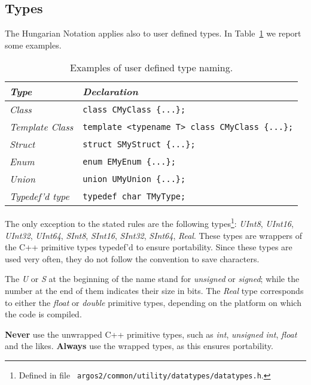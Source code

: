 \documentclass[a4paper]{article}
\begin{document}
\subsection{Types}
\label{subsec:types}
The Hungarian Notation applies also to user defined types. In Table~\ref{table:type_naming}
we report some examples.
\begin{table}[t]
  \caption{Examples of user defined type naming.}
  \label{table:type_naming}
  \centering
  \begin{footnotesize}
    \begin{tabular}{l l}
      \toprule
      {\it Type} & {\it Declaration}\\
      \midrule
      {\it Class} & \lstinline!class CMyClass {...};! \\
      {\it Template Class} & \lstinline!template <typename T> class CMyClass {...};! \\
      {\it Struct} & \lstinline!struct SMyStruct {...};! \\
      {\it Enum} & \lstinline!enum EMyEnum {...};! \\
      {\it Union} & \lstinline!union UMyUnion {...};! \\
      {\it Typedef'd type} & \lstinline!typedef char TMyType;! \\
      \bottomrule
    \end{tabular}
  \end{footnotesize}
\end{table}

The only exception to the stated rules are the following
types\footnote{Defined in file {\tt
argos2/common/utility/datatypes/datatypes.h}.}: {\it UInt8}, {\it
UInt16}, {\it UInt32}, {\it UInt64}, {\it SInt8}, {\it SInt16}, {\it
SInt32}, {\it SInt64}, {\it Real}. These types are wrappers of the C++
primitive types typedef'd to ensure portability. Since these types are
used very often, they do not follow the convention to save characters.

The {\it U} or {\it S} at the beginning of the name stand for {\it
unsigned} or {\it signed}; while the number at the end of them
indicates their size in bits. The {\it Real} type corresponds to
either the {\it float} or {\it double} primitive types, depending on
the platform on which the code is compiled.

\begin{warning}
  {\bf Never} use the unwrapped C++ primitive types, such as {\it int},
  {\it unsigned int}, {\it float} and the likes. {\bf Always} use the
  wrapped types, as this ensures portability.
\end{warning}
\end{document}
